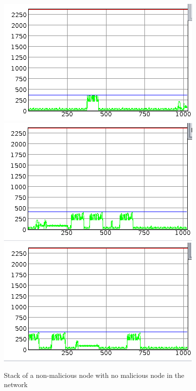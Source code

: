 \documentclass{report}
\begin{document}
\begin{figure}
\includegraphics[scale=0.4]{img/normal_stack2}
\includegraphics[scale=0.4]{img/normal_stack4}
\includegraphics[scale=0.4]{img/normal_stack5}\\
\caption{Stack of a non-malicious node with no malicious node in the network}
\end{figure}
\end{document}
